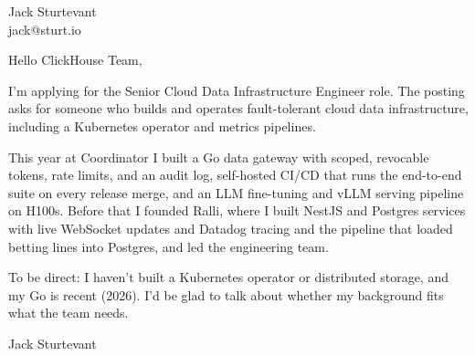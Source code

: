 \documentclass[11pt]{article}
\begin{document}
\raggedright

{\namefont\fontsize{20pt}{24pt}\selectfont Jack Sturtevant}\\[-0.3em]
jack@sturt.io

\vspace{1.2em}

Hello ClickHouse Team,

I'm applying for the Senior Cloud Data Infrastructure Engineer role. The posting asks for someone who builds and operates fault-tolerant cloud data infrastructure, including a Kubernetes operator and metrics pipelines.

This year at Coordinator I built a Go data gateway with scoped, revocable tokens, rate limits, and an audit log, self-hosted CI/CD that runs the end-to-end suite on every release merge, and an LLM fine-tuning and vLLM serving pipeline on H100s. Before that I founded Ralli, where I built NestJS and Postgres services with live WebSocket updates and Datadog tracing and the pipeline that loaded betting lines into Postgres, and led the engineering team.

To be direct: I haven't built a Kubernetes operator or distributed storage, and my Go is recent (2026). I'd be glad to talk about whether my background fits what the team needs.

\vspace{0.6em}
Jack Sturtevant
\end{document}
